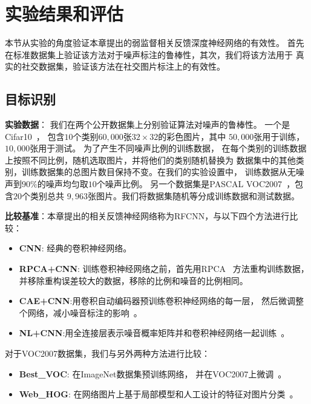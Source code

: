 \documentclass[doctor]{ustcthesis}
\begin{document}
\section{实验结果和评估}
本节从实验的角度验证本章提出的弱监督相关反馈深度神经网络的有效性。
首先在标准数据集上验证该方法对于噪声标注的鲁棒性，其次，我们将该方法用于
真实的社交数据集，验证该方法在社交图片标注上的有效性。

\subsection{目标识别}

\textbf{实验数据}： 我们在两个公开数据集上分别验证算法对噪声的鲁棒性。
一个是Cifar10~\cite{krizhevsky2009learning}，
包含$10$个类别$60,000$张$32\times 32$的彩色图片，其中
$50,000$张用于训练，$10,000$张用于测试。 为了产生不同噪声比例的训练数据，
在每个类别的训练数据上按照不同比例，随机选取图片，并将他们的类别随机替换为
数据集中的其他类别，训练数据集的总图片数目保持不变。在我们的实验设置中，
训练数据从无噪声到$90\%$的噪声均匀取$10$个噪声比例。
另一个数据集是PASCAL VOC2007~\cite{pascal-voc-2007}，包含$20$个类别总共
$9,963$张图片。我们将数据集随机等分成训练数据和测试数据。

\textbf{比较基准}：本章提出的相关反馈神经网络称为RFCNN，与以下四个方法进行比较：
\begin{itemize}\setlength{\itemsep}{-0.2em}
    \item \textbf{CNN}: 经典的卷积神经网络。
    \item \textbf{RPCA+CNN}: 训练卷积神经网络之前，首先用RPCA~\cite{candes2011robust}
        方法重构训练数据，并移除重构误差较大的数据，移除的比例和噪音的比例相同。
    \item \textbf{CAE+CNN}:用卷积自动编码器预训练卷积神经网络的每一层，
        然后微调整个网络，减小噪音标注的影响~\cite{luo2012hierarchical}。
    \item \textbf{NL+CNN}:用全连接层表示噪音概率矩阵并和卷积神经网络一起训练~\cite{sukhbaatar2014training}。
\end{itemize}
对于VOC2007数据集，我们与另外两种方法进行比较：
\begin{itemize}\setlength{\itemsep}{-0.2em}
    \item \textbf{Best\_VOC}: 在ImageNet数据集预训练网络，
        并在VOC2007上微调~\cite{oquab2014learning}。
    \item \textbf{Web\_HOG}: 在网络图片上基于局部模型和人工设计的特征对图片分类~\cite{divvala2014learning}。
\end{itemize}
\end{document}
